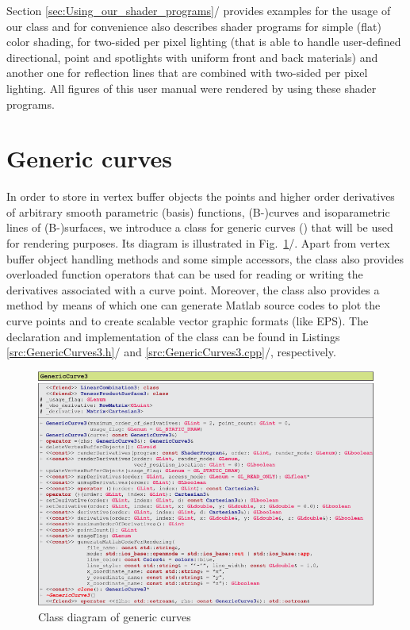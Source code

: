 \documentclass[b5paper, twosided]{book}
\newcommand{\CBlue}[1]{{\color[rgb]{0.0, 0.0, 0.9}{#1}}}
\DeclareRobustCommand{\mref}[1]{\ref{#1}{\relsize{-1}/\pageref{#1}}}
\begin{document}
Section \mref{sec:Using_our_shader_programs} provides examples for the usage of our class \CBlue{ShaderProgram} and for convenience also describes shader programs for simple (flat) color shading, for two-sided per pixel lighting (that is able to handle user-defined directional, point and spotlights with uniform front and back materials) and another one for reflection lines that are combined with two-sided per pixel lighting. All figures of this user manual were rendered by using these shader programs.



\section{Generic curves}

In order to store in vertex buffer objects the points and higher order derivatives of arbitrary smooth parametric (basis) functions, (B-)curves and isoparametric lines of (B-)surfaces, we introduce a class for generic curves (\CBlue{GenericCurve3}) that will be used for rendering purposes. Its diagram is illustrated in Fig.\ \mref{fig:UMLGenericCurve3}. Apart from vertex buffer object handling methods and some simple accessors, the class also provides overloaded function operators that can be used for reading or writing the derivatives associated with a curve point. Moreover, the class also provides a method by means of which one can generate Matlab source codes to plot the curve points and to create scalable vector graphic formats (like EPS). The declaration and implementation of the class can be found in Listings \mref{src:GenericCurves3.h} and \mref{src:GenericCurves3.cpp}, respectively.

\begin{figure}[!h]
	
	\centering
	\includegraphics[]{images/UMLGenericCurve3.pdf}
	\caption{Class diagram of generic curves}
	\label{fig:UMLGenericCurve3}
\end{figure}
\end{document}
